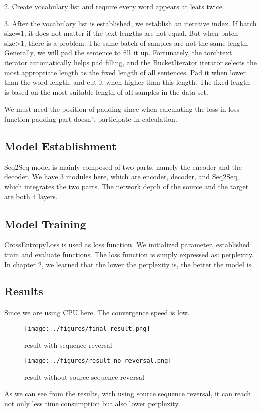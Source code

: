 2. Create vocabulary list and require every word appears at leats twice.

3. After the vocabulary list is established, we establish an iterative index. If batch size=1, it does not matter if the text lengths are not equal. But when batch size>1, there is a problem. The same batch of samples are not the same length. Generally, we will pad the sentence to fill it up. Fortunately, the torchtext iterator automatically helps pad filling, and the BucketIterator iterator selects the most appropriate length as the fixed length of all sentences. Pad it when lower than the word length, and cut it when higher than this length. The fixed length is based on the most suitable length of all samples in the data set. 

We must need the position of padding since when calculating the loss in loss function padding part doesn't participate in calculation.
\subsection{Model Establishment}
Seq2Seq model is mainly composed of two parts, namely the encoder and the decoder. We have 3 modules here, which are encoder, decoder, and Seq2Seq, which integrates the two parts. The network depth of the source and the target are both 4 layers.


\subsection{Model Training}
CrossEntropyLoss is used as loss function. We initialized parameter, established train and evaluate functions. The loss function is simply expressed as: perplexity. In chapter 2, we learned that the lower the perplexity is, the better the model is. 
\subsection{Results}
Since we are using CPU here. The convergence speed is low.
\begin{figure}[h]
	\centering
	\texttt{[image: ./figures/final-result.png]}	
	\caption{result with sequence reversal}
\end{figure}
\begin{figure}[h]
	\centering
	\texttt{[image: ./figures/result-no-reversal.png]}	
	\caption{result without source sequence reversal}
\end{figure}

As we can see from the results, with using source sequence reversal, it can reach not only less time consumption but also lower perplexity. 


